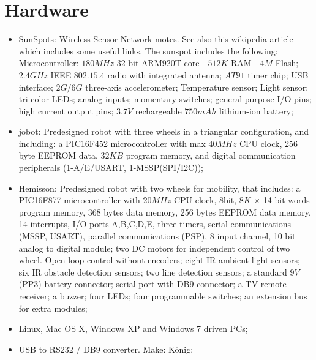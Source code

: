 \documentclass[a4paper, 12pt, titlepage]{article}
\begin{document}



\section{Hardware}
\begin{itemize}
    \item SunSpots: Wireless Sensor Network motes. See also 
    \href{http://en.wikipedia.org/wiki/Sun_SPOT}
        {this wikipedia article} - which includes some useful links. The sunspot
        includes the following:
        \subitem Microcontroller: $180 MHz$ 32 bit ARM920T core - $512K$ RAM -
        $4M$
        Flash;
        \subitem $2.4 GHz$ IEEE $802.15.4$ radio with integrated antenna;
        \subitem $AT91$ timer chip;
        \subitem USB interface;
        \subitem $2G/6G$ three-axis accelerometer;
        \subitem Temperature sensor;
        \subitem Light sensor;
         tri-color LEDs;
         analog inputs;
         momentary switches;
         general purpose I/O pins;
         high current output pins;
        \subitem $3.7V$ rechargeable $750 mAh$ lithium-ion battery;
    \item jobot: Predesigned robot with three wheels in a triangular
    configuration, and including:
        \subitem a PIC16F452 microcontroller with max $40MHz$ CPU clock, 256 byte
        EEPROM data, $32KB$ program memory, and digital communication peripherals
        (1-A/E/USART, 1-MSSP(SPI/I2C));
    \item Hemisson: Predesigned robot with two wheels for mobility, that includes:
        \subitem a PIC16F877 microcontroller with $20MHz$ CPU clock, 8bit,
        $8K$ $\times$ 14 bit words program memory, 368 bytes data memory, 256 bytes
        EEPROM data memory, 14 interrupts, I/O ports A,B,C,D,E, three timers,
        serial communications (MSSP, USART), parallel communications (PSP), 8
        input channel, 10 bit analog to digital module;
        \subitem two DC motors for independent control of two wheel. Open loop
        control without encoders;
        \subitem eight IR ambient light sensors;
        \subitem six IR obstacle detection sensors;
        \subitem two line detection sensors;
        \subitem a standard $9V$ (PP3) battery connector;
        \subitem serial port with DB9 connector;
        \subitem a TV remote receiver;
        \subitem a buzzer;
        \subitem four LEDs;
        \subitem four programmable switches;
        \subitem an extension bus for extra modules;
    \item Linux, Mac OS X, Windows XP and Windows 7 driven PCs;
    \item USB to RS232 / DB9 converter. Make: K\"onig;
        

\end{itemize}
\end{document}
